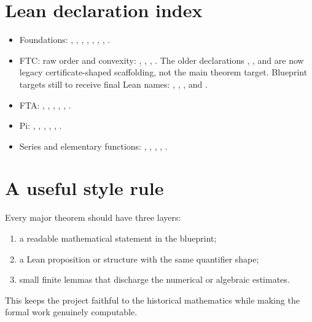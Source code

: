 \section{Lean declaration index}

\begin{itemize}
  \item Foundations:
  , , , , ,
  , , .

  \item FTC:
  raw order and convexity:
  , , ,
  .
  The older declarations
  , , and
  are now legacy certificate-shaped scaffolding, not the main theorem target.
  Blueprint targets still to receive final Lean names:
  , ,
  , and .

  \item FTA:
  , , ,
  , ,
  .

  \item Pi:
  , , ,
  , ,
  .

  \item Series and elementary functions:
  ,
  ,
  ,
  ,
  .
\end{itemize}

\section{A useful style rule}

Every major theorem should have three layers:
\begin{enumerate}
  \item a readable mathematical statement in the blueprint;
  \item a Lean proposition or structure with the same quantifier shape;
  \item small finite lemmas that discharge the numerical or algebraic
  estimates.
\end{enumerate}
This keeps the project faithful to the historical mathematics while making
the formal work genuinely computable.
